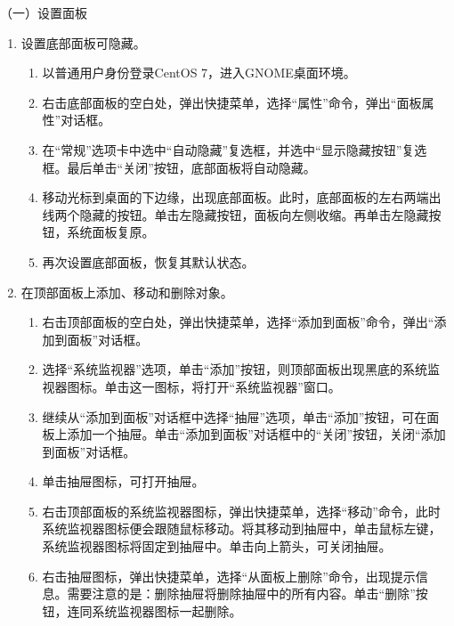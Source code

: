 \vspace{0.1in}
（一）设置面板
\begin{enumerate}
  \item 设置底部面板可隐藏。
    \begin{enumerate}
      \item 以普通用户身份登录CentOS 7，进入GNOME桌面环境。
      \item 右击底部面板的空白处，弹出快捷菜单，选择“属性”命令，弹出“面板属性”对话框。
      \item 在“常规”选项卡中选中“自动隐藏”复选框，并选中“显示隐藏按钮”复选框。最后单击“关闭”按钮，底部面板将自动隐藏。
      \item 移动光标到桌面的下边缘，出现底部面板。此时，底部面板的左右两端出线两个隐藏的按钮。单击左隐藏按钮，面板向左侧收缩。再单击左隐藏按钮，系统面板复原。
      \item 再次设置底部面板，恢复其默认状态。
    \end{enumerate}
  \item 在顶部面板上添加、移动和删除对象。
    \begin{enumerate}
      \item 右击顶部面板的空白处，弹出快捷菜单，选择“添加到面板”命令，弹出“添加到面板”对话框。
      \item 选择“系统监视器”选项，单击“添加”按钮，则顶部面板出现黑底的系统监视器图标。单击这一图标，将打开“系统监视器”窗口。
      \item 继续从“添加到面板”对话框中选择“抽屉”选项，单击“添加”按钮，可在面板上添加一个抽屉。单击“添加到面板”对话框中的“关闭”按钮，关闭“添加到面板”对话框。
      \item 单击抽屉图标，可打开抽屉。
      \item 右击顶部面板的系统监视器图标，弹出快捷菜单，选择“移动”命令，此时系统监视器图标便会跟随鼠标移动。将其移动到抽屉中，单击鼠标左键，系统监视器图标将固定到抽屉中。单击向上箭头，可关闭抽屉。
      \item 右击抽屉图标，弹出快捷菜单，选择“从面板上删除”命令，出现提示信息。需要注意的是：删除抽屉将删除抽屉中的所有内容。单击“删除”按钮，连同系统监视器图标一起删除。
    \end{enumerate}
\end{enumerate}

